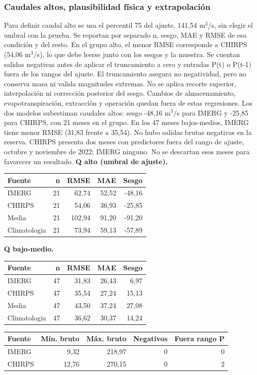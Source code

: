 \documentclass[10pt,a4paper]{article}
\begin{document}
\subsubsection*{Caudales altos, plausibilidad física y extrapolación}
Para definir caudal alto se usa el percentil 75 del ajuste, 141,54 m$^3$/s, sin elegir el umbral con la prueba. Se reportan por separado n, sesgo, MAE y RMSE de esa condición y del resto. En el grupo alto, el menor RMSE corresponde a CHIRPS (54,06 m$^3$/s), lo que debe leerse junto con los sesgos y la muestra. Se cuentan salidas negativas antes de aplicar el truncamiento a cero y entradas P(t) o P(t-1) fuera de los rangos del ajuste. El truncamiento asegura no negatividad, pero no conserva masa ni valida magnitudes extremas. No se aplica recorte superior, interpolación ni corrección posterior del sesgo. Cambios de almacenamiento, evapotranspiración, extracción y operación quedan fuera de estas regresiones. Los dos modelos subestiman caudales altos: sesgo -48,16 m$^3$/s para IMERG y -25,85 para CHIRPS, con 21 meses en el grupo. En los 47 meses bajos-medios, IMERG tiene menor RMSE (31,83 frente a 35,54). No hubo salidas brutas negativas en la reserva. CHIRPS presenta dos meses con predictores fuera del rango de ajuste, octubre y noviembre de 2022; IMERG ninguno. No se descartan esos meses para favorecer un resultado.
\textbf{Q alto (umbral de ajuste).}\begin{center}\small\begin{tabular}{lrrrr}\hline
Fuente & n & RMSE & MAE & Sesgo \\ \hline
IMERG & 21 & 62,74 & 52,52 & -48,16 \\
CHIRPS & 21 & 54,06 & 36,93 & -25,85 \\
Media & 21 & 102,94 & 91,20 & -91,20 \\
Climatologia & 21 & 73,94 & 59,13 & -57,89 \\
\hline\end{tabular}\end{center}
\textbf{Q bajo-medio.}\begin{center}\small\begin{tabular}{lrrrr}\hline
Fuente & n & RMSE & MAE & Sesgo \\ \hline
IMERG & 47 & 31,83 & 26,43 & 6,97 \\
CHIRPS & 47 & 35,54 & 27,24 & 15,13 \\
Media & 47 & 43,50 & 37,24 & 27,08 \\
Climatologia & 47 & 36,62 & 30,37 & 14,24 \\
\hline\end{tabular}\end{center}
\begin{center}\small\begin{tabular}{lrrrr}\hline
Fuente & Mín. bruto & Máx. bruto & Negativos & Fuera rango P \\ \hline
IMERG & 9,32 & 218,97 & 0 & 0 \\
CHIRPS & 12,76 & 270,15 & 0 & 2 \\
\hline\end{tabular}\end{center}
\end{document}
